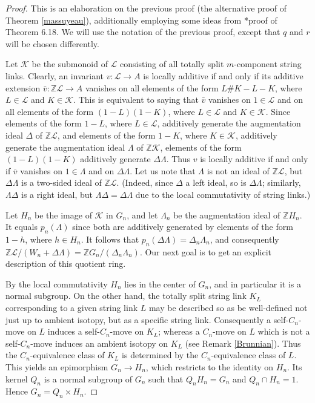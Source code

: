 \documentclass[a4paper,12pt,reqno,oneside]{amsart} %
\theoremstyle{plain}
\theoremstyle{definition}
\theoremstyle{named}
\def\x{\times}
\renewcommand{\:}{\colon}
\def\Z{\mathbb{Z}}
\def\K{\mathcal{K}}
\def\L{\mathcal{L}}
\begin{document}
\begin{proof} This is an elaboration on the previous proof (the alternative proof of Theorem \ref{massuyeau}), 
additionally employing some ideas from \cite{Hab}*{proof of Theorem 6.18}.
We will use the notation of the previous proof, except that $q$ and $r$ will be chosen differently.

Let $\K$ be the submonoid of $\L$ consisting of all totally split $m$-component string links.
Clearly, an invariant $v\:\L\to A$ is locally additive if and only if its additive extension $\bar v\:\Z\L\to A$
vanishes on all elements of the form $L\#K-L-K$, where $L\in\L$ and $K\in\K$.
This is equivalent to saying that $\bar v$ vanishes on $1\in\L$ and on all elements of the form $(1-L)(1-K)$,
where $L\in\L$ and $K\in\K$.
Since elements of the form $1-L$, where $L\in\L$, additively generate the augmentation ideal $\Delta$ of $\Z\L$, 
and elements of the form $1-K$, where $K\in\K$, additively generate the augmentation ideal $\Lambda$ of $\Z\K$,
elements of the form $(1-L)(1-K)$ additively generate $\Delta\Lambda$.
Thus $v$ is locally additive if and only if $\bar v$ vanishes on $1\in\Lambda$ and on $\Delta\Lambda$.
Let us note that $\Lambda$ is not an ideal of $\Z\L$, but $\Delta\Lambda$ is a two-sided ideal of $\Z\L$.
(Indeed, since $\Delta$ a left ideal, so is $\Delta\Lambda$; similarly, $\Lambda\Delta$ is a right ideal, but
$\Lambda\Delta=\Delta\Lambda$ due to the local commutativity of string links.)

Let $H_n$ be the image of $\K$ in $G_n$, and let $\Lambda_n$ be the augmentation ideal of $\Z H_n$.
It equals $p_n(\Lambda)$ since both are additively generated by elements of the form $1-h$, where $h\in H_n$.
It follows that $p_n(\Delta\Lambda)=\Delta_n\Lambda_n$, and consequently 
$\Z\L/(W_n+\Delta\Lambda)=\Z G_n/(\Delta_n\Lambda_n)$.
Our next goal is to get an explicit description of this quotient ring.

By the local commutativity $H_n$ lies in the center of $G_n$, and in particular it is a normal subgroup.
On the other hand, the totally split string link $K_L$ corresponding to a given string link $L$ may be 
described so as be well-defined not just up to ambient isotopy, but as a specific string link.
Consequently a self-$C_n$-move on $L$ induces a self-$C_n$-move on $K_L$; whereas a $C_n$-move on $L$
which is not a self-$C_n$-move induces an ambient isotopy on $K_L$ (see Remark \ref{Brunnian}).
Thus the $C_n$-equivalence class of $K_L$ is determined by the $C_n$-equivalence class of $L$.
This yields an epimorphism $G_n\to H_n$, which restricts to the identity on $H_n$.
Its kernel $Q_n$ is a normal subgroup of $G_n$ such that $Q_nH_n=G_n$ and $Q_n\cap H_n=1$.
Hence $G_n=Q_n\x H_n$.


\end{proof}
\end{document}
